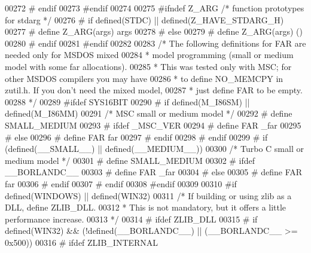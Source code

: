 \begin{DoxyCode}
00272 \textcolor{preprocessor}{#  endif}
00273 \textcolor{preprocessor}{#endif}
00274 
00275 \textcolor{preprocessor}{#ifndef Z\_ARG }\textcolor{comment}{/* function prototypes for stdarg */}\textcolor{preprocessor}{}
00276 \textcolor{preprocessor}{#  if defined(STDC) || defined(Z\_HAVE\_STDARG\_H)}
00277 \textcolor{preprocessor}{#    define Z\_ARG(args)  args}
00278 \textcolor{preprocessor}{#  else}
00279 \textcolor{preprocessor}{#    define Z\_ARG(args)  ()}
00280 \textcolor{preprocessor}{#  endif}
00281 \textcolor{preprocessor}{#endif}
00282 
00283 \textcolor{comment}{/* The following definitions for FAR are needed only for MSDOS mixed}
00284 \textcolor{comment}{ * model programming (small or medium model with some far allocations).}
00285 \textcolor{comment}{ * This was tested only with MSC; for other MSDOS compilers you may have}
00286 \textcolor{comment}{ * to define NO\_MEMCPY in zutil.h.  If you don't need the mixed model,}
00287 \textcolor{comment}{ * just define FAR to be empty.}
00288 \textcolor{comment}{ */}
00289 \textcolor{preprocessor}{#ifdef SYS16BIT}
00290 \textcolor{preprocessor}{#  if defined(M\_I86SM) || defined(M\_I86MM)}
00291      \textcolor{comment}{/* MSC small or medium model */}
00292 \textcolor{preprocessor}{#    define SMALL\_MEDIUM}
00293 \textcolor{preprocessor}{#    ifdef \_MSC\_VER}
00294 \textcolor{preprocessor}{#      define FAR \_far}
00295 \textcolor{preprocessor}{#    else}
00296 \textcolor{preprocessor}{#      define FAR far}
00297 \textcolor{preprocessor}{#    endif}
00298 \textcolor{preprocessor}{#  endif}
00299 \textcolor{preprocessor}{#  if (defined(\_\_SMALL\_\_) || defined(\_\_MEDIUM\_\_))}
00300      \textcolor{comment}{/* Turbo C small or medium model */}
00301 \textcolor{preprocessor}{#    define SMALL\_MEDIUM}
00302 \textcolor{preprocessor}{#    ifdef \_\_BORLANDC\_\_}
00303 \textcolor{preprocessor}{#      define FAR \_far}
00304 \textcolor{preprocessor}{#    else}
00305 \textcolor{preprocessor}{#      define FAR far}
00306 \textcolor{preprocessor}{#    endif}
00307 \textcolor{preprocessor}{#  endif}
00308 \textcolor{preprocessor}{#endif}
00309 
00310 \textcolor{preprocessor}{#if defined(WINDOWS) || defined(WIN32)}
00311    \textcolor{comment}{/* If building or using zlib as a DLL, define ZLIB\_DLL.}
00312 \textcolor{comment}{    * This is not mandatory, but it offers a little performance increase.}
00313 \textcolor{comment}{    */}
00314 \textcolor{preprocessor}{#  ifdef ZLIB\_DLL}
00315 \textcolor{preprocessor}{#    if defined(WIN32) && (!defined(\_\_BORLANDC\_\_) || (\_\_BORLANDC\_\_ >= 0x500))}
00316 \textcolor{preprocessor}{#      ifdef ZLIB\_INTERNAL}

\end{DoxyCode}
